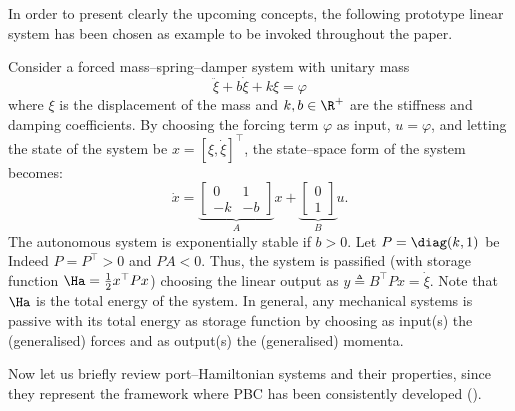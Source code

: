 %
In order to present clearly the upcoming concepts, the following prototype linear system has been chosen as example to be invoked throughout the paper.
%
\begin{exmp}\label{ex:msd_sys}
    Consider a forced mass--spring--damper system with unitary mass
    \[\ddot{\xi} + b\dot{\xi} + k\xi =\varphi\]
    where $\xi$ is the displacement of the mass and $k,b\in\R^+$ are the stiffness and damping coefficients. By choosing the forcing term $\varphi$ as input, $u = \varphi$, and letting the state of the system be $x = [\xi,\dot{\xi}]^\top$, the state--space form of the system becomes:
    \[\dot{x} = \underbrace{\begin{bmatrix}0&1\\-k&-b\end{bmatrix}}_Ax+ \underbrace{\begin{bmatrix}0\\1\end{bmatrix}}_Bu.\]
    The autonomous system is exponentially stable if $b>0$. Let $P=\diag({k,1})$ be 
    Indeed $P=P^\top>0$ and $PA<0$. Thus, the system is passified (with storage function $\Ha = \frac{1}{2}x^\top Px$) choosing the linear output as $y \triangleq B^\top Px = \dot{\xi}$. Note that $\Ha$ is the total energy of the system. In general, any mechanical systems is passive with its total energy as storage function by choosing as input(s) the (generalised) forces and as output(s) the (generalised) momenta.
\end{exmp}
%
%
%

Now let us briefly review port--Hamiltonian systems and their properties, since they represent the framework where PBC has been consistently developed (\citealp{ortega2001putting}).
